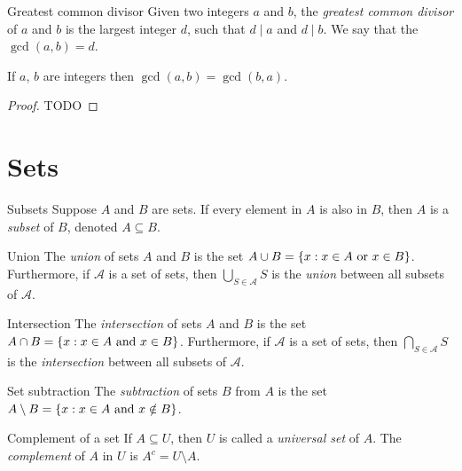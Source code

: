 \documentclass{report}
\begin{document}
\begin{definition}{Greatest common divisor}{}
  Given two integers $a$ and $b$, the \emph{greatest common divisor} of $a$ and $b$ is the largest integer $d$, such that $d \mid a$ and $d \mid b$.
  We say that the $\gcd(a, b) = d$.
\end{definition}


\begin{lemma}{}{}
  If $a$, $b$  are integers then $\gcd(a, b)  = \gcd(b, a)$.
\end{lemma}

\begin{proof}
  TODO
\end{proof}

\chapter{Sets}

\begin{definition}{Subsets}{}
  Suppose $A$ and $B$ are sets. If every element in $A$ is also in $B$, then $A$ is a \emph{subset} of $B$, denoted $A \subseteq B$.
\end{definition}

\begin{definition}{Union}{}
  The \emph{union} of sets $A$ and $B$ is the set $A \cup B = \{x : x \in A \text{ or } x \in B\}$.
  Furthermore, if $\mathscr{A}$ is a set of sets, then $\bigcup_{S \in \mathscr{A}} S$ is the \emph{union} between all subsets of $\mathscr{A}$.
\end{definition}

\begin{definition}{Intersection}{}
  The \emph{intersection} of sets $A$ and $B$ is the set $A \cap B = \{x : x \in A \text{ and } x \in B\}$.
  Furthermore, if $\mathscr{A}$ is a set of sets, then $\bigcap_{S \in \mathscr{A}} S$ is the \emph{intersection} between all subsets of $\mathscr{A}$.
\end{definition}

\begin{definition}{Set subtraction}{}
  The \emph{subtraction} of sets $B$ from $A$ is the set $A \setminus B = \{x : x \in A \text{ and } x \notin B\}$.
\end{definition}

\begin{definition}{Complement of a set}{}
  If $A \subseteq U$, then $U$ is called a \emph{universal set} of $A$.
  The \emph{complement} of $A$ in $U$ is $A^c = U \setminus A$.
\end{definition}
\end{document}
